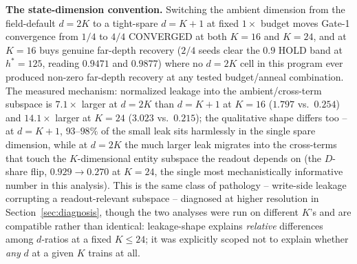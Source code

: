 \textbf{The state-dimension convention.} Switching the ambient dimension
from the field-default $d{=}2K$ to a tight-spare $d{=}K{+}1$ at fixed
$1\times$ budget moves Gate-1 convergence from $1/4$ to $4/4$ CONVERGED at
both $K{=}16$ and $K{=}24$, and at $K{=}16$ buys genuine far-depth
recovery ($2/4$ seeds clear the $0.9$ HOLD band at $h^\ast{=}125$, reading
$0.9471$ and $0.9877$) where no $d{=}2K$ cell in this program ever produced
non-zero far-depth recovery at any tested budget/anneal combination.
The measured mechanism: normalized leakage into the ambient/cross-term
subspace is $7.1\times$ larger at $d{=}2K$ than $d{=}K{+}1$ at $K{=}16$
($1.797$ vs.\ $0.254$) and $14.1\times$ larger at $K{=}24$ ($3.023$ vs.\
$0.215$); the qualitative shape differs too -- at $d{=}K{+}1$, $93$--$98\%$
of the small leak sits harmlessly in the single spare dimension, while at
$d{=}2K$ the much larger leak migrates into the cross-terms that touch the
$K$-dimensional entity subspace the readout depends on (the $D$-share
flip, $0.929 \to 0.270$ at $K{=}24$, the single most mechanistically
informative number in this analysis).
This is the same class of pathology -- write-side leakage corrupting a
readout-relevant subspace -- diagnosed at higher resolution in
Section~\ref{sec:diagnosis}, though the two analyses were run on
different $K$'s and are compatible rather than identical: leakage-shape
explains \emph{relative} differences among $d$-ratios at a fixed $K \leq
24$; it was explicitly scoped not to explain whether \emph{any} $d$ at a
given $K$ trains at all. %


